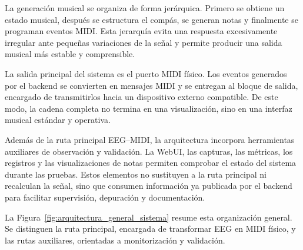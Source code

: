 \documentclass[../main.tex]{subfiles}
\begin{document}
La generación musical se organiza de forma jerárquica. Primero se obtiene un estado musical, después se estructura el compás, se generan notas y finalmente se programan eventos MIDI. Esta jerarquía evita una respuesta excesivamente irregular ante pequeñas variaciones de la señal y permite producir una salida musical más estable y comprensible.

La salida principal del sistema es el puerto MIDI físico. Los eventos generados por el backend se convierten en mensajes MIDI y se entregan al bloque de salida, encargado de transmitirlos hacia un dispositivo externo compatible. De este modo, la cadena completa no termina en una visualización, sino en una interfaz musical estándar y operativa.

Además de la ruta principal EEG--MIDI, la arquitectura incorpora herramientas auxiliares de observación y validación. La WebUI, las capturas, las métricas, los registros y las visualizaciones de notas permiten comprobar el estado del sistema durante las pruebas. Estos elementos no sustituyen a la ruta principal ni recalculan la señal, sino que consumen información ya publicada por el backend para facilitar supervisión, depuración y documentación.

La Figura~\ref{fig:arquitectura_general_sistema} resume esta organización general. Se distinguen la ruta principal, encargada de transformar EEG en MIDI físico, y las rutas auxiliares, orientadas a monitorización y validación.
\end{document}
